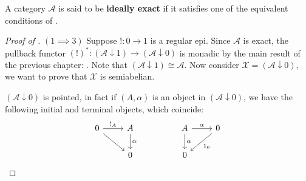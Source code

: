 \begin{mainbox}{}
    \begin{defi}
        A category $\mathcal{A}$ is said to be \textbf{ideally exact} if it satisfies one of the equivalent conditions of .
    \end{defi}
\end{mainbox}

\begin{subbox}{}
    \begin{proof}[\textit{Proof of }]\label{The proof}
        $(1\implies 3)$ Suppose $! : 0 \to 1$ is a regular epi. Since $\mathcal{A}$ is exact, the pullback functor $(!)^*: (\mathcal{A} \downarrow 1) \to (\mathcal{A} \downarrow 0)$ is monadic by the main result of the previous chapter: . Note that $(\mathcal{A} \downarrow 1) \cong \mathcal{A}$. Now consider $\mathcal{X} = (\mathcal{A} \downarrow 0)$, we want to prove that $\mathcal{X}$ is semiabelian. 
        
        $(\mathcal{A} \downarrow 0)$ is pointed, in fact if $(A,\alpha)$ is an object in $(\mathcal{A} \downarrow 0)$, we have the following initial and terminal objects, which coincide:
        \[
        \begin{tikzcd}
        0 \arrow[r, "!_A"] \arrow[rd] & A \arrow[d, "\alpha"] &  & A \arrow[r, "\alpha"] \arrow[d, "\alpha"] & 0 \arrow[ld, "1_0"] \\
                                      & 0                     &  & 0                                         &                    
        \end{tikzcd}
        \]


\end{proof}
\end{subbox}
